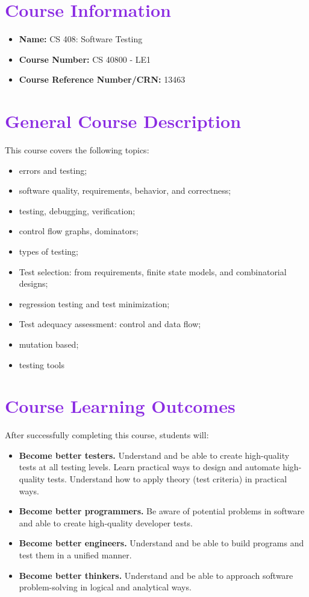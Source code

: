 \documentclass[letterpaper,11pt]{article}
\begin{document}
\section*{\textcolor{BlueViolet}{Course Information}}

\begin{itemize}
\item \Large{\textbf{Name:} CS 408: Software Testing}
\item \textbf{Course Number:} CS 40800 - LE1
\item \textbf{Course Reference Number/CRN:} 13463
\end{itemize}

\section*{\textcolor{BlueViolet}{General Course Description}}
This course covers the following topics:
\begin{itemize}
\item errors and testing;
\item software quality, requirements, behavior, and correctness;
\item testing, debugging, verification;
\item control flow graphs, dominators;
\item types of testing;
\item Test selection: from requirements, finite state models, and combinatorial
  designs;
\item regression testing and test minimization;
\item Test adequacy
  assessment: control and data flow;
\item mutation based;
\item testing tools
\end{itemize}

\section*{\textcolor{BlueViolet}{Course Learning Outcomes}}
After successfully completing this course, students will:

\begin{itemize}

\item \textbf{Become better testers.}
Understand and be able to create high-quality tests at all testing levels.
Learn practical ways to design and automate high-quality tests.
Understand how to apply theory (test criteria) in practical ways.

\item \textbf{Become better programmers.}
Be aware of potential problems in software and able to create high-quality developer tests.

\item \textbf{Become better engineers.}
Understand and be able to build programs and test them in a unified manner.

\item \textbf{Become better thinkers.}
Understand and be able to approach software problem-solving in logical and analytical ways.
\end{itemize}
\end{document}
